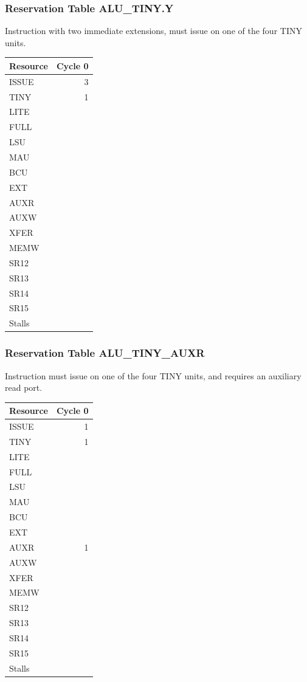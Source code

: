 \subsubsection{Reservation Table ALU\_TINY.Y} \label{sec:reservation-ALU-TINY.Y}

Instruction with two immediate extensions, must issue on one of the four TINY units.
\medskip

\begin{tabular}{|l|r|} \hline
Resource	& Cycle 0 \\ \hline
\textsf{ISSUE}	& 3	\\
\textsf{TINY}	& 1	\\
\textsf{LITE}	& 	\\
\textsf{FULL}	& 	\\
\textsf{LSU}	& 	\\
\textsf{MAU}	& 	\\
\textsf{BCU}	& 	\\
\textsf{EXT}	& 	\\
\textsf{AUXR}	& 	\\
\textsf{AUXW}	& 	\\
\textsf{XFER}	& 	\\
\textsf{MEMW}	& 	\\
\textsf{SR12}	& 	\\
\textsf{SR13}	& 	\\
\textsf{SR14}	& 	\\
\textsf{SR15}	& 	\\
\hline Stalls	& 	\\
\hline \end{tabular}

\subsubsection{Reservation Table ALU\_TINY\_AUXR} \label{sec:reservation-ALU-TINY-AUXR}

Instruction must issue on one of the four TINY units, and requires an auxiliary read port.
\medskip

\begin{tabular}{|l|r|} \hline
Resource	& Cycle 0 \\ \hline
\textsf{ISSUE}	& 1	\\
\textsf{TINY}	& 1	\\
\textsf{LITE}	& 	\\
\textsf{FULL}	& 	\\
\textsf{LSU}	& 	\\
\textsf{MAU}	& 	\\
\textsf{BCU}	& 	\\
\textsf{EXT}	& 	\\
\textsf{AUXR}	& 1	\\
\textsf{AUXW}	& 	\\
\textsf{XFER}	& 	\\
\textsf{MEMW}	& 	\\
\textsf{SR12}	& 	\\
\textsf{SR13}	& 	\\
\textsf{SR14}	& 	\\
\textsf{SR15}	& 	\\
\hline Stalls	& 	\\
\hline \end{tabular}

